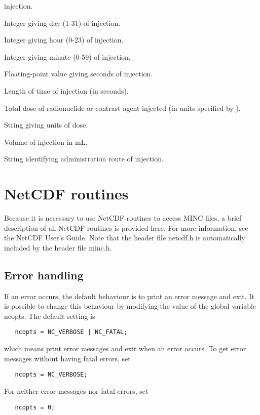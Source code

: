 \documentclass{article}
\begin{document}
\begin{description}
      injection.
   \item [\code{MIinjection\_day}] Integer giving day (1-31) of
      injection.
   \item [\code{MIinjection\_hour}] Integer giving hour (0-23) of
      injection.
   \item [\code{MIinjection\_minute}] Integer giving minute (0-59) of
      injection.
   \item [\code{MIinjection\_seconds}] Floating-point value giving
      seconds of injection. 
   \item [\code{MIinjection\_length}] Length of time of injection (in
      seconds).
   \item [\code{MIinjection\_dose}] Total dose of radionuclide or contrast
      agent injected (in units specified by ).
   \item [\code{MIdose\_units}] String giving units of dose.
   \item [\code{MIinjection\_volume}] Volume of injection in mL.
   \item [\code{MIinjection\_route}] String identifying administration
      route of injection.
\end{description}

\section{NetCDF routines}

Because it is necessary to use NetCDF routines to access MINC files, a
brief description of all NetCDF routines is provided here. For more
information, see the NetCDF User's Guide. Note that the header file
netcdf.h is automatically included by the header file minc.h.

\subsection{Error handling}

If an error occurs, the default behaviour is to print an error message
and exit. It is possible to change this behaviour by modifying the
value of the global variable ncopts. The default setting is 
\begin{verbatim}
   ncopts = NC_VERBOSE | NC_FATAL;
\end{verbatim}
which means print error messages and exit when an error occurs. To
get error messages without having fatal errors, set 
\begin{verbatim}
   ncopts = NC_VERBOSE;
\end{verbatim}
For neither error messages nor fatal errors, set
\begin{verbatim}
   ncopts = 0;
\end{verbatim}
\end{document}
